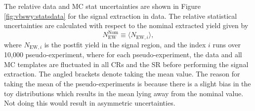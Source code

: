 The relative data and MC stat uncertainties are shown in Figure \ref{fig:vbswy:statsdata} for the signal extraction in data. The relative statistical uncertainties are calculated with respect to the nominal extracted yield given by 
\begin{equation}\label{eq:central_value_extraction}
  N_{\text{EW}}^{\text{Nom}} \equiv \langle N_{\text{EW},i}\rangle,
\end{equation}
where $N_{\text{EW},i}$ is the postfit \ewwy yield in the signal region, and the index $i$ runs over 10,000 pseudo-experiment, where for each pseudo-experiment, the data and all MC templates are fluctuated in all CRs and the SR before performing the signal extraction. The angled brackets denote taking the mean value. The reason for taking the mean of the pseudo-experiments is because there is a slight bias in the toy distributions which results in the mean lying away from the nominal value. Not doing this would result in asymmetric uncertainties. %
%


